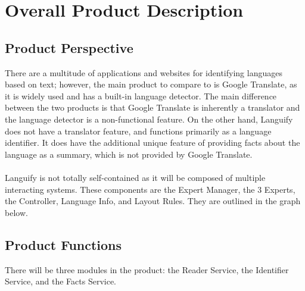 \section{Overall Product Description}
\label{sec:overall_description}


\subsection{Product Perspective}
\label{sub:product_perspective}
There are a multitude of applications and websites for identifying languages based on text; however, the main product to compare to is Google Translate, 
as it is widely used and has a built-in language detector. The main difference between the two products is that Google Translate is inherently a translator
and the language detector is a non-functional feature. On the other hand, Languify does not have a translator feature, and functions primarily as a language identifier.
It does have the additional unique feature of providing facts about the language as a summary, which is not provided by Google Translate. \\ \\
Languify is not totally self-contained as it will be composed of multiple interacting systems. These components are the Expert Manager, the 3 Experts, 
the Controller, Language Info, and Layout Rules. They are outlined in the graph below.


\subsection{Product Functions}
\label{sub:product_functions}
There will be three modules in the product: the Reader Service, the Identifier Service, and the Facts Service.

